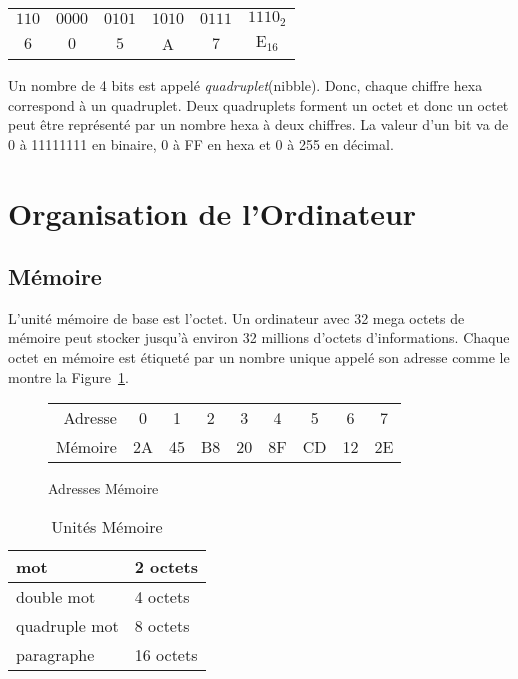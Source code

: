 \begin{tabular}{cccccc}
$110$ & $0000$ & $0101$ & $1010$ & $0111$ & $1110_2$ \\
  $6$ & $0$    &   $5$  &   A  &  $7$   &    $\mathrm{E}_{16}$ \\
\end{tabular}\newline

Un nombre de 4 bits est appelé \emph{quadruplet}(nibble). Donc, chaque chiffre hexa
correspond à un quadruplet. Deux quadruplets forment un octet et donc un octet peut
être représenté par un nombre hexa à deux chiffres. La valeur d'un bit va
de 0 à 11111111 en binaire, 0 à FF en hexa et 0 à 255 en décimal.

\section{Organisation de l'Ordinateur}

\subsection{Mémoire}

L'unité mémoire de base est l'octet.  Un
ordinateur avec 32 mega octets de mémoire peut stocker jusqu'à environ
32 millions d'octets d'informations. Chaque octet en mémoire est étiqueté
par un nombre unique appelé son adresse comme le montre la Figure~\ref{fig:memory}.

\begin{figure}[ht]
\begin{center}
\begin{tabular}{rcccccccc}
Adresse & 0 & 1 & 2 & 3 & 4 & 5 & 6 & 7 \\
\cline{2-9}
Mémoire & \multicolumn{1}{|c}{2A}  & \multicolumn{1}{|c}{45}  
       & \multicolumn{1}{|c}{B8} & \multicolumn{1}{|c}{20} 
       & \multicolumn{1}{|c}{8F} & \multicolumn{1}{|c}{CD} 
       & \multicolumn{1}{|c}{12} & \multicolumn{1}{|c|}{2E} \\
\cline{2-9}
\end{tabular}
\caption{ Adresses Mémoire \label{fig:memory} }
\end{center}
\end{figure}

\begin{table}
\begin{center}
\begin{tabular}{|l|l|}
\hline
mot & 2 octets \\ \hline
double mot & 4 octets \\ \hline
quadruple mot & 8 octets \\ \hline
paragraphe & 16 octets \\ \hline
\end{tabular}
\caption{ Unités Mémoire \label{tab:mem_units} }
\end{center}
\end{table}

